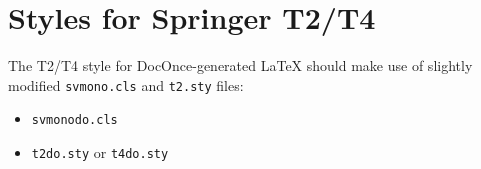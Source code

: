 \documentclass[graybox,sectrefs,envcountresetchap,open=right,final]{svmonodo}
\makeatletter
\def\cleardoublepage{\clearpage\if@twoside \ifodd\c@page\else
\hbox{}
\thispagestyle{empty}
\newpage
\if@twocolumn\hbox{}\newpage\fi\fi\fi}
\makeatother
\begin{document}
\chapter{Styles for Springer T2/T4}
The T2/T4 style for DocOnce-generated {\LaTeX} should make use of
slightly modified \texttt{svmono.cls} and \texttt{t2.sty} files:
\begin{itemize}
 \item \texttt{svmonodo.cls}
 \item \texttt{t2do.sty} or \texttt{t4do.sty}
\end{itemize}
\noindent
\clearemptydoublepage
{}
\thispagestyle{empty}


\cleardoublepage{}  %
\printindex
\end{document}
